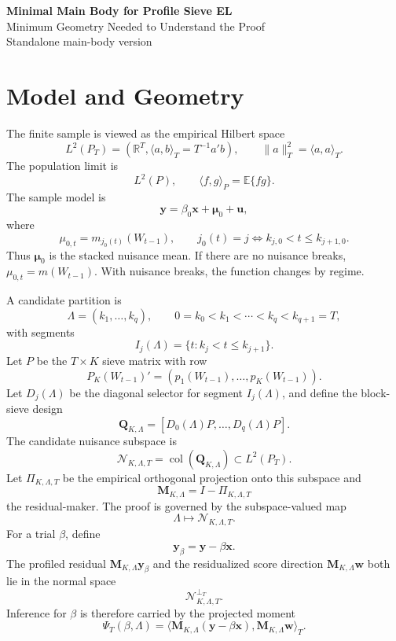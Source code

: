 \documentclass[12pt]{article}
\numberwithin{equation}{section}
\theoremstyle{definition}
\newcommand{\E}{\mathbb E}
\newcommand{\R}{\mathbb R}
\newcommand{\N}{\mathcal N}
\newcommand{\LtwoT}{L^2(P_T)}
\newcommand{\LtwoP}{L^2(P)}
\newcommand{\innerT}[2]{\langle #1,#2\rangle_T}
\newcommand{\innerP}[2]{\langle #1,#2\rangle_P}
\begin{document}
\begin{center}
{\Large\bf Minimal Main Body for Profile Sieve EL}\\[6pt]
{\large Minimum Geometry Needed to Understand the Proof}\\[6pt]
{\normalsize Standalone main-body version}\\[12pt]
\end{center}

\tableofcontents
\newpage

\section{Model and Geometry}

The finite sample is viewed as the empirical Hilbert space
\[
    \LtwoT=(\R^T,\innerT{a}{b}=T^{-1}a'b),
    \qquad \|a\|_T^2=\innerT{a}{a}.
\]
The population limit is
\[
    \LtwoP,\qquad \innerP{f}{g}=\E\{fg\}.
\]
The sample model is
\[
    \bm y=\beta_0\bm x+\bm\mu_0+\bm u,
\]
where
\[
    \mu_{0,t}=m_{j_0(t)}(W_{t-1}),
    \qquad
    j_0(t)=j\iff k_{j,0}<t\le k_{j+1,0}.
\]
Thus \(\bm\mu_0\) is the stacked nuisance mean. If there are no nuisance
breaks, \(\mu_{0,t}=m(W_{t-1})\). With nuisance breaks, the function changes by
regime.

A candidate partition is
\[
    \Lambda=(k_1,\ldots,k_q),
    \qquad
    0=k_0<k_1<\cdots<k_q<k_{q+1}=T,
\]
with segments
\[
    I_j(\Lambda)=\{t:k_j<t\le k_{j+1}\}.
\]
Let \(P\) be the \(T\times K\) sieve matrix with row
\[
    P_K(W_{t-1})'=(p_1(W_{t-1}),\ldots,p_K(W_{t-1})).
\]
Let \(D_j(\Lambda)\) be the diagonal selector for segment \(I_j(\Lambda)\), and
define the block-sieve design
\[
    \bm Q_{K,\Lambda}
    =
    [D_0(\Lambda)P,\ldots,D_q(\Lambda)P].
\]
The candidate nuisance subspace is
\[
    \N_{K,\Lambda,T}
    =
    \operatorname{col}(\bm Q_{K,\Lambda})
    \subset \LtwoT.
\]
Let \(\Pi_{K,\Lambda,T}\) be the empirical orthogonal projection onto this
subspace and
\[
    \bm M_{K,\Lambda}=I-\Pi_{K,\Lambda,T}
\]
the residual-maker. The proof is governed by the subspace-valued map
\[
    \Lambda\longmapsto \N_{K,\Lambda,T}.
\]
For a trial \(\beta\), define
\[
    \bm y_\beta=\bm y-\beta\bm x.
\]
The profiled residual \(\bm M_{K,\Lambda}\bm y_\beta\) and the residualized
score direction \(\bm M_{K,\Lambda}\bm w\) both lie in the normal space
\[
    \N_{K,\Lambda,T}^{\perp_T}.
\]
Inference for \(\beta\) is therefore carried by the projected moment
\[
    \Psi_T(\beta,\Lambda)
    =
    \innerT{\bm M_{K,\Lambda}(\bm y-\beta\bm x)}
            {\bm M_{K,\Lambda}\bm w}.
\]
\end{document}
